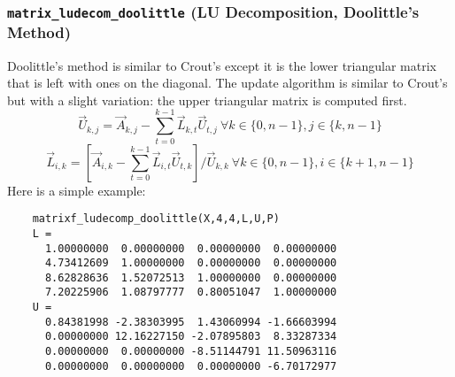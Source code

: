 \subsubsection{{\tt matrix\_ludecom\_doolittle} (LU Decomposition, Doolittle's Method)}
\label{module:matrix:ludecomp_doolittle}
Doolittle's method is similar to Crout's except it is the lower triangular
matrix that is left with ones on the diagonal.
The update algorithm is similar to Crout's but with a slight variation: the
upper triangular matrix is computed first.
%
\[
    \vec{U}_{k,j} = \vec{A}_{k,j} -
                    \sum_{t=0}^{k-1}{ \vec{L}_{k,t} \vec{U}_{t,j} }
                    \ \forall k \in \{0,n-1\}, j \in \{k,n-1\}
\]
%
\[
    \vec{L}_{i,k} = \left[
                        \vec{A}_{i,k} -
                        \sum_{t=0}^{k-1}{ \vec{L}_{i,t} \vec{U}_{t,k} }
                    \right] / \vec{U}_{k,k}
                    \ \forall k \in \{0,n-1\}, i \in \{k+1,n-1\}
\]
%
Here is a simple example:
\begin{verbatim}
    matrixf_ludecomp_doolittle(X,4,4,L,U,P)
    L =
      1.00000000  0.00000000  0.00000000  0.00000000
      4.73412609  1.00000000  0.00000000  0.00000000
      8.62828636  1.52072513  1.00000000  0.00000000
      7.20225906  1.08797777  0.80051047  1.00000000
    U =
      0.84381998 -2.38303995  1.43060994 -1.66603994
      0.00000000 12.16227150 -2.07895803  8.33287334
      0.00000000  0.00000000 -8.51144791 11.50963116
      0.00000000  0.00000000  0.00000000 -6.70172977
\end{verbatim}

